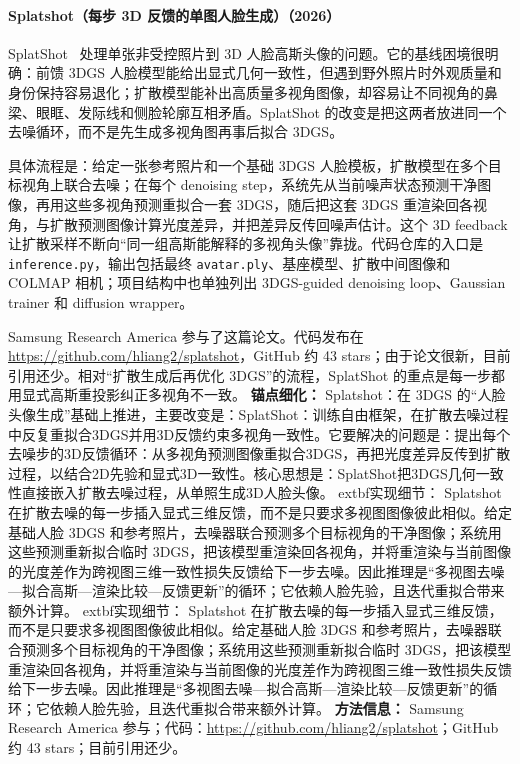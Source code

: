 \paragraph{Splatshot（每步 3D 反馈的单图人脸生成）（2026）}
SplatShot~\cite{2606_01493} 处理单张非受控照片到 3D 人脸高斯头像的问题。它的基线困境很明确：前馈 3DGS 人脸模型能给出显式几何一致性，但遇到野外照片时外观质量和身份保持容易退化；扩散模型能补出高质量多视角图像，却容易让不同视角的鼻梁、眼眶、发际线和侧脸轮廓互相矛盾。SplatShot 的改变是把这两者放进同一个去噪循环，而不是先生成多视角图再事后拟合 3DGS。

具体流程是：给定一张参考照片和一个基础 3DGS 人脸模板，扩散模型在多个目标视角上联合去噪；在每个 denoising step，系统先从当前噪声状态预测干净图像，再用这些多视角预测重拟合一套 3DGS，随后把这套 3DGS 重渲染回各视角，与扩散预测图像计算光度差异，并把差异反传回噪声估计。这个 3D feedback 让扩散采样不断向“同一组高斯能解释的多视角头像”靠拢。代码仓库的入口是 \texttt{inference.py}，输出包括最终 \texttt{avatar.ply}、基座模型、扩散中间图像和 COLMAP 相机；项目结构中也单独列出 3DGS-guided denoising loop、Gaussian trainer 和 diffusion wrapper。

Samsung Research America 参与了这篇论文。代码发布在 \url{https://github.com/hliang2/splatshot}，GitHub 约 43 stars；由于论文很新，目前引用还少。相对“扩散生成后再优化 3DGS”的流程，SplatShot 的重点是每一步都用显式高斯重投影纠正多视角不一致。
\textbf{锚点细化：} Splatshot：在 3DGS 的“人脸头像生成”基础上推进，主要改变是：SplatShot：训练自由框架，在扩散去噪过程中反复重拟合3DGS并用3D反馈约束多视角一致性。它要解决的问题是：提出每个去噪步的3D反馈循环：从多视角预测图像重拟合3DGS，再把光度差异反传到扩散过程，以结合2D先验和显式3D一致性。核心思想是：SplatShot把3DGS几何一致性直接嵌入扩散去噪过程，从单照生成3D人脸头像。
	extbf{实现细节：} Splatshot 在扩散去噪的每一步插入显式三维反馈，而不是只要求多视图图像彼此相似。给定基础人脸 3DGS 和参考照片，去噪器联合预测多个目标视角的干净图像；系统用这些预测重新拟合临时 3DGS，把该模型重渲染回各视角，并将重渲染与当前图像的光度差作为跨视图三维一致性损失反馈给下一步去噪。因此推理是“多视图去噪—拟合高斯—渲染比较—反馈更新”的循环；它依赖人脸先验，且迭代重拟合带来额外计算。
	extbf{实现细节：} Splatshot 在扩散去噪的每一步插入显式三维反馈，而不是只要求多视图图像彼此相似。给定基础人脸 3DGS 和参考照片，去噪器联合预测多个目标视角的干净图像；系统用这些预测重新拟合临时 3DGS，把该模型重渲染回各视角，并将重渲染与当前图像的光度差作为跨视图三维一致性损失反馈给下一步去噪。因此推理是“多视图去噪—拟合高斯—渲染比较—反馈更新”的循环；它依赖人脸先验，且迭代重拟合带来额外计算。
\textbf{方法信息：} Samsung Research America 参与；代码：\url{https://github.com/hliang2/splatshot}；GitHub 约 43 stars；目前引用还少。



